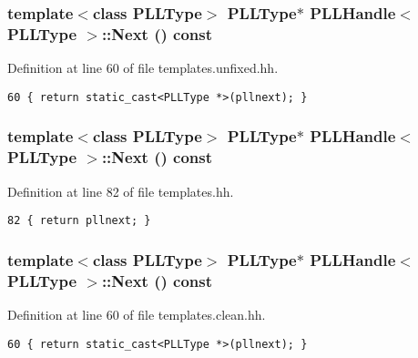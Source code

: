 \subsubsection{\setlength{\rightskip}{0pt plus 5cm}template$<$class PLLType$>$ {\bf PLLType}$\ast$ PLLHandle$<$ {\bf PLLType} $>$::Next () const\hspace{0.3cm}{\tt  [inline]}}\label{classPLLHandle_a40}




Definition at line 60 of file templates.unfixed.hh.



\footnotesize\begin{verbatim}60 { return static_cast<PLLType *>(pllnext); } 
\end{verbatim}\normalsize 
{}
\subsubsection{\setlength{\rightskip}{0pt plus 5cm}template$<$class PLLType$>$ {\bf PLLType}$\ast$ PLLHandle$<$ {\bf PLLType} $>$::Next () const\hspace{0.3cm}{\tt  [inline]}}\label{classPLLHandle_a27}




Definition at line 82 of file templates.hh.



\footnotesize\begin{verbatim}82 { return pllnext; } 
\end{verbatim}\normalsize 
{}
\subsubsection{\setlength{\rightskip}{0pt plus 5cm}template$<$class PLLType$>$ {\bf PLLType}$\ast$ PLLHandle$<$ {\bf PLLType} $>$::Next () const\hspace{0.3cm}{\tt  [inline]}}\label{classPLLHandle_a14}




Definition at line 60 of file templates.clean.hh.



\footnotesize\begin{verbatim}60 { return static_cast<PLLType *>(pllnext); } 
\end{verbatim}\normalsize 
{}
